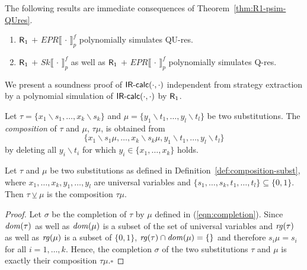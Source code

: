 \documentclass{llncs}
\newcommand{\qres}{\mbox{\sf Q-res}}
\newcommand{\qures}{\mbox{\sf QU-res}}
\newcommand{\Rfo}{$\mbox{\sf R}_1$}
\newcommand{\IRcalcPM}[2]{$\mbox{\sf IR-calc}(#1,#2)$}
\newcommand{\dom}[1]{\ensuremath\mathit{dom}(#1)}
\newcommand{\range}[1]{\ensuremath\mathit{rg}(#1)}
\newcommand{\complassign}{\ensuremath{\veebar}}
\newcommand{\is}{\ensuremath{\backslash}}
\newcommand{\SkQBFtoPL}[3]{\mathit{Sk}\llbracket\,#1\,\rrbracket_{#2}^{#3}}
\newcommand{\EPRQBFtoPL}[3]{\mathit{EPR}\llbracket\,#1\,\rrbracket_{#2}^{#3}}
\renewcommand{\qed}{\hfill\ensuremath{\square}}
\begin{document}
\begin{corollary}\label{cor:Rfo-psim-qres}
The following results are immediate consequences of 
Theorem~\ref{thm:R1-psim-QUres}.
\begin{enumerate}
\item \Rfo{} $+$ $\EPRQBFtoPL{\cdot}{p}{f}$ 
polynomially simulates \qures.

\item \Rfo{} $+$ $\SkQBFtoPL{\cdot}{p}{f}$ as well as \Rfo{} $+$
  $\EPRQBFtoPL{\cdot}{p}{f}$ polynomially simulates \qres.

\end{enumerate}
\end{corollary}

We present a soundness proof of \IRcalcPM{\cdot}{\cdot}{} independent
from strategy extraction by a polynomial simulation of
\IRcalcPM{\cdot}{\cdot}{} by \Rfo.

\begin{definition}
\label{def:composition-subst}
Let $\tau = \{x_1\is s_1, \ldots , x_k \is s_k\}$ and $\mu =
\{y_1\is t_1, \ldots , y_l\is t_l\}$ be two substitutions. The
\emph{composition} of $\tau$ and $\mu$, $\tau\mu$, is obtained
from
\begin{displaymath}
\big\{x_1\is s_1\mu, \ldots , x_k \is s_k\mu, 
y_1\is t_1, \ldots , y_l\is t_l \big\} 
\end{displaymath}
by deleting all $y_i\is t_i$ for which $y_i \in \{x_1, \ldots , x_k\}$
holds.
\end{definition}

\begin{lemma}\label{lem:compl-is-composition}
Let $\tau$ and $\mu$ be two substitutions as defined in
Definition~\ref{def:composition-subst}, where $x_1,\ldots , x_k, y_1,
\ldots , y_l$ are universal variables and $\{s_1,\ldots , s_k, t_1,
\ldots , t_l\} \subseteq \{0, 1\}$. Then $\tau \complassign \mu$
is the composition $\tau\mu$.
\end{lemma}

\begin{proof}
Let $\sigma$ be the completion of $\tau$ by $\mu$ defined in
(\ref{eqn:completion}).
Since $\dom{\tau}$ as well as $\dom{\mu}$ is a subset of the set of
universal variables and $\range{\tau}$ as well as $\range{\mu}$ is a
subset of $\{0,1\}$, $\range{\tau} \cap \dom{\mu} = \{\}$ and
therefore $s_i\mu = s_i$ for all $i=1,\ldots , k$. Hence, the
completion $\sigma$ of the two substitutions $\tau$ and $\mu$ is
exactly their composition $\tau\mu$.\qed
\end{proof}
\end{document}
